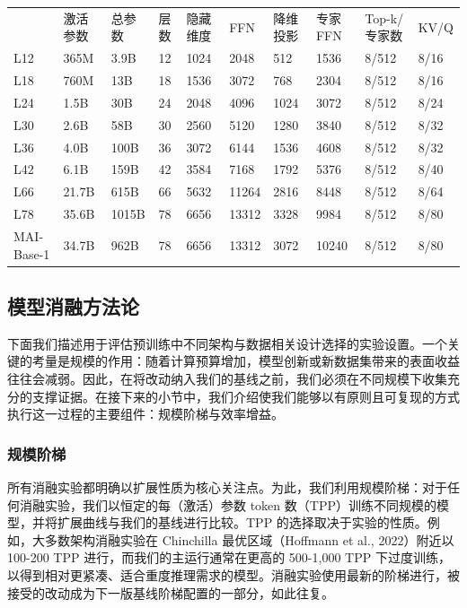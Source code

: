 \documentclass[
  10
]{article}
\newcounter{none} %
\begin{document}
{\def\LTcaptype{none} %
\begin{longtable}[]{@{}llllllllll@{}}
\toprule\noalign{}
\endhead
\bottomrule\noalign{}
\endlastfoot
\multirow{2}{*}{模型} & \multirow{2}{*}{激活参数} &
\multirow{2}{*}{总参数} & \multirow{2}{*}{层数} &
\multirow{2}{*}{隐藏维度} & \multirow{2}{*}{FFN} & \multirow{2}{*}{降维投影} & \multirow{2}{*}{专家 FFN} & \multirow{2}{*}{Top-k/专家数} &
\multirow{2}{*}{KV/Q} \\
 \\
L12 & 365M & 3.9B & 12 & 1024 & 2048 & 512 & 1536 & 8/512 & 8/16 \\
L18 & 760M & 13B & 18 & 1536 & 3072 & 768 & 2304 & 8/512 & 8/16 \\
L24 & 1.5B & 30B & 24 & 2048 & 4096 & 1024 & 3072 & 8/512 & 8/24 \\
L30 & 2.6B & 58B & 30 & 2560 & 5120 & 1280 & 3840 & 8/512 & 8/32 \\
L36 & 4.0B & 100B & 36 & 3072 & 6144 & 1536 & 4608 & 8/512 & 8/32 \\
L42 & 6.1B & 159B & 42 & 3584 & 7168 & 1792 & 5376 & 8/512 & 8/40 \\
L66 & 21.7B & 615B & 66 & 5632 & 11264 & 2816 & 8448 & 8/512 & 8/64 \\
L78 & 35.6B & 1015B & 78 & 6656 & 13312 & 3328 & 9984 & 8/512 & 8/80 \\
MAI-Base-1 & 34.7B & 962B & 78 & 6656 & 13312 & 3072 & 10240 & 8/512 &
8/80 \\
\end{longtable}
}

\subsection{模型消融方法论}\label{model-ablation-methodology}

下面我们描述用于评估预训练中不同架构与数据相关设计选择的实验设置。一个关键的考量是规模的作用：随着计算预算增加，模型创新或新数据集带来的表面收益往往会减弱。因此，在将改动纳入我们的基线之前，我们必须在不同规模下收集充分的支撑证据。在接下来的小节中，我们介绍使我们能够以有原则且可复现的方式执行这一过程的主要组件：规模阶梯与效率增益。

\subsubsection{规模阶梯}\label{scaling-ladder}

所有消融实验都明确以扩展性质为核心关注点。为此，我们利用规模阶梯：对于任何消融实验，我们以恒定的每（激活）参数 token 数（TPP）训练不同规模的模型，并将扩展曲线与我们的基线进行比较。TPP 的选择取决于实验的性质。例如，大多数架构消融实验在 Chinchilla 最优区域（Hoffmann et al., 2022）附近以 100-200 TPP 进行，而我们的主运行通常在更高的 500-1,000 TPP 下过度训练，以得到相对更紧凑、适合重度推理需求的模型。消融实验使用最新的阶梯进行，被接受的改动成为下一版基线阶梯配置的一部分，如此往复。
\end{document}
